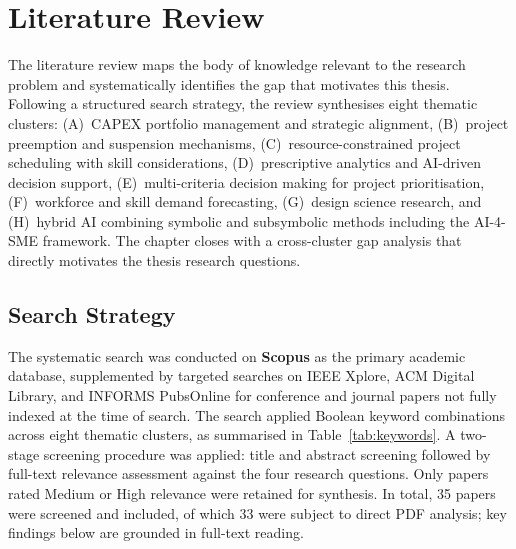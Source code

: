 \chapter{Literature Review}
\label{chap:literature_review}

The literature review maps the body of knowledge relevant to the research problem and
systematically identifies the gap that motivates this thesis. Following a structured search
strategy, the review synthesises eight thematic clusters: (A)~CAPEX portfolio management and
strategic alignment, (B)~project preemption and suspension mechanisms, (C)~resource-constrained
project scheduling with skill considerations, (D)~prescriptive analytics and AI-driven decision
support, (E)~multi-criteria decision making for project prioritisation, (F)~workforce and skill
demand forecasting, (G)~design science research, and (H)~hybrid AI combining symbolic and
subsymbolic methods including the AI-4-SME framework. The chapter closes with a cross-cluster gap
analysis that directly motivates the thesis research questions.

\section{Search Strategy}
\label{sec:search_strategy}

The systematic search was conducted on \textbf{Scopus} as the primary academic database,
supplemented by targeted searches on IEEE Xplore, ACM Digital Library, and INFORMS PubsOnline
for conference and journal papers not fully indexed at the time of search. The search applied
Boolean keyword combinations across eight thematic clusters, as summarised in
Table~\ref{tab:keywords}. A two-stage screening procedure was applied: title and abstract
screening followed by full-text relevance assessment against the four research questions. Only
papers rated Medium or High relevance were retained for synthesis. In total, 35 papers were
screened and included, of which 33 were subject to direct PDF analysis; key findings below are
grounded in full-text reading.


